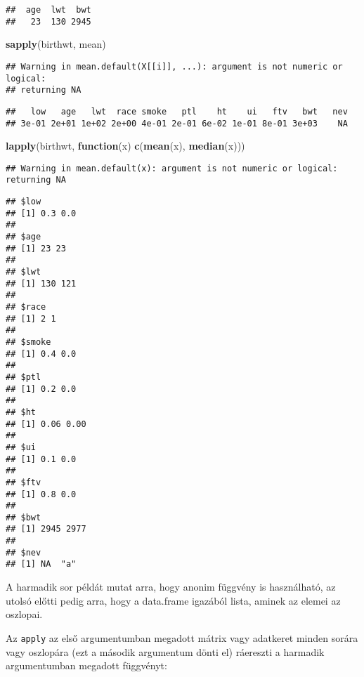 \documentclass[
]{book}
\newenvironment{Shaded}{\begin{snugshade}}{\end{snugshade}}
\newcommand{\ControlFlowTok}[1]{\textcolor[rgb]{0.13,0.29,0.53}{\textbf{#1}}}
\newcommand{\KeywordTok}[1]{\textcolor[rgb]{0.13,0.29,0.53}{\textbf{#1}}}
\newcommand{\NormalTok}[1]{#1}
\begin{document}
\begin{verbatim}
##  age  lwt  bwt 
##   23  130 2945
\end{verbatim}

\begin{Shaded}
\begin{Highlighting}[]
\KeywordTok{sapply}\NormalTok{(birthwt, mean)}
\end{Highlighting}
\end{Shaded}

\begin{verbatim}
## Warning in mean.default(X[[i]], ...): argument is not numeric or logical:
## returning NA
\end{verbatim}

\begin{verbatim}
##   low   age   lwt  race smoke   ptl    ht    ui   ftv   bwt   nev 
## 3e-01 2e+01 1e+02 2e+00 4e-01 2e-01 6e-02 1e-01 8e-01 3e+03    NA
\end{verbatim}

\begin{Shaded}
\begin{Highlighting}[]
\KeywordTok{lapply}\NormalTok{(birthwt, }\ControlFlowTok{function}\NormalTok{(x) }\KeywordTok{c}\NormalTok{(}\KeywordTok{mean}\NormalTok{(x), }\KeywordTok{median}\NormalTok{(x)))}
\end{Highlighting}
\end{Shaded}

\begin{verbatim}
## Warning in mean.default(x): argument is not numeric or logical: returning NA
\end{verbatim}

\begin{verbatim}
## $low
## [1] 0.3 0.0
## 
## $age
## [1] 23 23
## 
## $lwt
## [1] 130 121
## 
## $race
## [1] 2 1
## 
## $smoke
## [1] 0.4 0.0
## 
## $ptl
## [1] 0.2 0.0
## 
## $ht
## [1] 0.06 0.00
## 
## $ui
## [1] 0.1 0.0
## 
## $ftv
## [1] 0.8 0.0
## 
## $bwt
## [1] 2945 2977
## 
## $nev
## [1] NA  "a"
\end{verbatim}

A harmadik sor példát mutat arra, hogy anonim függvény is használható, az utolsó előtti pedig arra, hogy a data.frame igazából lista, aminek az elemei az oszlopai.

Az \texttt{apply} az első argumentumban megadott mátrix vagy adatkeret minden sorára vagy oszlopára (ezt a második argumentum dönti el) ráereszti a harmadik argumentumban megadott függvényt:
\end{document}

